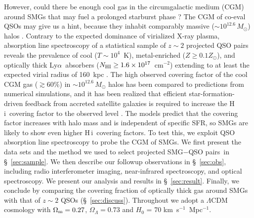 \documentclass[iop,revtex4,twocolumn,apj,numberedappendix,appendixfloats]{emulateapj}
\newcommand{\cmsq}{{cm$^{-2}$}}
\newcommand{\lya}{Ly$\alpha$}
\newcommand{\HI}{H\,{\sc i}}
\newcommand{\sqps}{SMG$-$QSO pairs}
\begin{document}
However, could there be enough cool gas in the circumgalactic medium (CGM) around SMGs that may fuel a prolonged starburst phase \citep[e.g.][]{Narayanan15}? The CGM of co-eval QSOs may give us a hint, because they inhabit comparably massive ($\sim$$10^{12.6}\,M_{\odot}$) halos \citep{White12}. Contrary to the expected dominance of virialized X-ray plasma, absorption line spectroscopy of a statistical sample of $z \sim 2$ projected QSO pairs reveals the prevalence of cool ($T \sim 10^4$~K), metal-enriched ($Z \geq 0.1 Z_\odot$), and optically thick \lya\ absorbers ($N_{\rm HI} \geq 1.6\times10^{17}$~\cmsq) extending to at least the expected virial radius of 160~kpc \citep[the ``Quasar Probing Quasar'' (QPQ) project:][]{Hennawi06,Prochaska13,Prochaska13a}. The high observed covering factor of the cool CGM gas ($\gtrsim 60\%$) in $\sim$$10^{12.6}\,M_{\odot}$ halos
has been compared to predictions from numerical simulations, and it has been realized that efficient star-formation-driven feedback from accreted satellite galaxies is required to increase the \HI\ covering factor to the observed level \citep[e.g.,][]{Fumagalli14,Faucher-Giguere15,Rahmati15,Faucher-Giguere16}.
The models predict that the covering factor increases with halo mass and is independent of specific SFR, so SMGs are likely to show even higher \HI\ covering factors. To test this, we exploit QSO absorption line spectroscopy to probe the CGM of SMGs. We first present the data sets and the method we used to select projected \sqps\ in \S~\ref{sec:sample}. We then describe our followup observations in \S~\ref{sec:obs}, including radio interferometer imaging, near-infrared spectroscopy, and optical spectroscopy. We present our analysis and results in \S~\ref{sec:result}. Finally, we conclude by comparing the covering fraction of optically thick gas around SMGs with that of $z \sim 2$ QSOs (\S~\ref{sec:discuss}). Throughout we adopt a $\Lambda$CDM cosmology with $\Omega_{\rm m}=0.27$, $\Omega_\Lambda=0.73$ and $H_0$ = 70 km~s$^{-1}$~Mpc$^{-1}$.  
\end{document}
